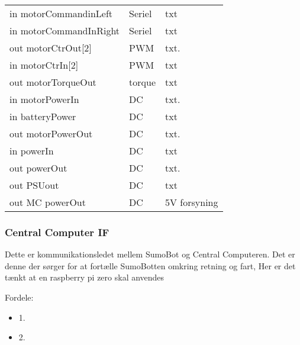 \begin{table*}[]
\begin{tabular}{lp{5cm}p{7cm}}
        in motorCommandinLeft      & Seriel                        & txt                                                                                              \\
        in motorCommandInRight   & Seriel                          & txt 
                 \\
        out motorCtrOut[2]      & PWM                             & txt.&                                                                                          \\
        in motorCtrIn[2]         & PWM                               & txt 
                \\
        out motorTorqueOut    & torque                               & txt 
                \\
        in motorPowerIn        & DC                             & txt.& 
                \\
        in batteryPower        & DC                               & txt 
                \\
        out motorPowerOut      & DC                           & txt.& 
                \\
        in powerIn             & DC                               & txt 
                \\
        out powerOut           & DC                              & txt.& 
                \\
        out PSUout             & DC                               & txt 
                \\
        out MC powerOut        & DC                               & 5V forsyning 
                \\
    \end{tabular}%
\end{table*}


\subsubsection*{\textbf{Central Computer IF}}
Dette er kommunikationsledet mellem SumoBot og Central Computeren. Det er denne der sørger for at fortælle SumoBotten omkring retning og fart, 
Her er det tænkt at en raspberry pi zero skal anvendes


Fordele: 
\begin{itemize}
\item 1.
\item 2.
\end{itemize}

